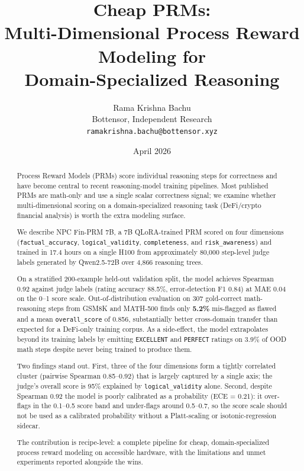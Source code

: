 \documentclass[10pt,letterpaper]{article}
\title{\bfseries Cheap PRMs:\\
Multi-Dimensional Process Reward Modeling for\\
Domain-Specialized Reasoning}
\author{Rama Krishna Bachu\\
\small Bottensor, Independent Research\\
\small \texttt{ramakrishna.bachu@bottensor.xyz}}
\date{April 2026}
\begin{document}
\maketitle

\begin{abstract}
\noindent
Process Reward Models (PRMs) score individual reasoning steps for correctness and have become central to recent reasoning-model training pipelines. Most published PRMs are math-only and use a single scalar correctness signal; we examine whether multi-dimensional scoring on a domain-specialized reasoning task (DeFi/crypto financial analysis) is worth the extra modeling surface.

We describe NPC Fin-PRM 7B, a 7B QLoRA-trained PRM scored on four dimensions (\texttt{factual\_accuracy}, \texttt{logical\_validity}, \texttt{completeness}, and \texttt{risk\_awareness}) and trained in 17.4 hours on a single H100 from approximately 80{,}000 step-level judge labels generated by Qwen2.5-72B over 4{,}866 reasoning trees.

On a stratified 200-example held-out validation split, the model achieves Spearman 0.92 against judge labels (rating accuracy 88.5\%, error-detection F1 0.84) at MAE 0.04 on the 0--1 score scale. Out-of-distribution evaluation on 307 gold-correct math-reasoning steps from GSM8K and MATH-500 finds only \textbf{5.2\%} mis-flagged as flawed and a mean \texttt{overall\_score} of 0.856, substantially better cross-domain transfer than expected for a DeFi-only training corpus. As a side-effect, the model extrapolates beyond its training labels by emitting \texttt{EXCELLENT} and \texttt{PERFECT} ratings on 3.9\% of OOD math steps despite never being trained to produce them.

Two findings stand out. First, three of the four dimensions form a tightly correlated cluster (pairwise Spearman 0.85--0.92) that is largely captured by a single axis; the judge's overall score is 95\% explained by \texttt{logical\_validity} alone. Second, despite Spearman 0.92 the model is poorly calibrated as a probability (ECE = 0.21): it over-flags in the 0.1--0.5 score band and under-flags around 0.5--0.7, so the score scale should not be used as a calibrated probability without a Platt-scaling or isotonic-regression sidecar.

The contribution is recipe-level: a complete pipeline for cheap, domain-specialized process reward modeling on accessible hardware, with the limitations and unmet experiments reported alongside the wins.
\end{abstract}
\end{document}
